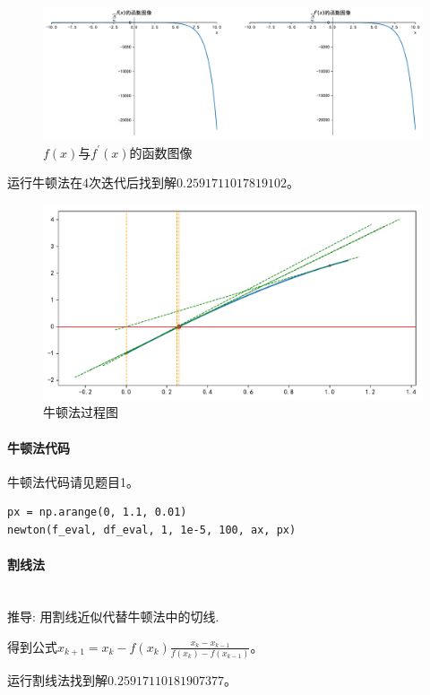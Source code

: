 \begin{figure}[H]
	\centering
	\caption{$f(x)$与$f^\prime(x)$的函数图像}
	\includegraphics[width=.9\linewidth]{fig_1.pdf}
\end{figure}

运行牛顿法在4次迭代后找到解$0.2591711017819102$。

\begin{figure}[H]
	\centering
	\caption{牛顿法过程图}
	\includegraphics[width=.87\linewidth]{fig10.pdf}
\end{figure}

\paragraph{牛顿法代码}

牛顿法代码请见题目1。

\begin{verbatim}
px = np.arange(0, 1.1, 0.01)
newton(f_eval, df_eval, 1, 1e-5, 100, ax, px)
\end{verbatim}
 
\paragraph{割线法}
~\\
推导: 用割线近似代替牛顿法中的切线.

得到公式$x_{k+1} = x_k - f\left(x_k\right) \frac{x_k - x_{k-1}}{f\left(x_k\right) - f\left( x_{k-1}\right)}$。

运行割线法找到解$0.25917110181907377$。

